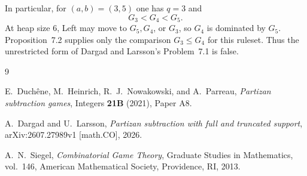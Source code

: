 \documentclass[11pt]{amsart}
\begin{document}
In particular, for $(a,b)=(3,5)$ one has $q=3$ and
\[
G_3<G_4<G_5.
\]
At heap size $6$, Left may move to $G_5,G_4$, or $G_3$, so $G_4$ is
dominated by $G_5$. Proposition~7.2 supplies only the comparison
$G_3\le G_4$ for this ruleset. Thus the unrestricted form of
Dargad and Larsson's Problem~7.1 is false.

\begin{thebibliography}{9}

E.~Duch\^ene, M.~Heinrich, R.~J.~Nowakowski, and A.~Parreau,
\emph{Partizan subtraction games},
Integers \textbf{21B} (2021), Paper A8.

A.~Dargad and U.~Larsson,
\emph{Partizan subtraction with full and truncated support},
arXiv:2607.27989v1 [math.CO], 2026.

A.~N.~Siegel,
\emph{Combinatorial Game Theory},
Graduate Studies in Mathematics, vol.~146,
American Mathematical Society, Providence, RI, 2013.

\end{thebibliography}
\end{document}
